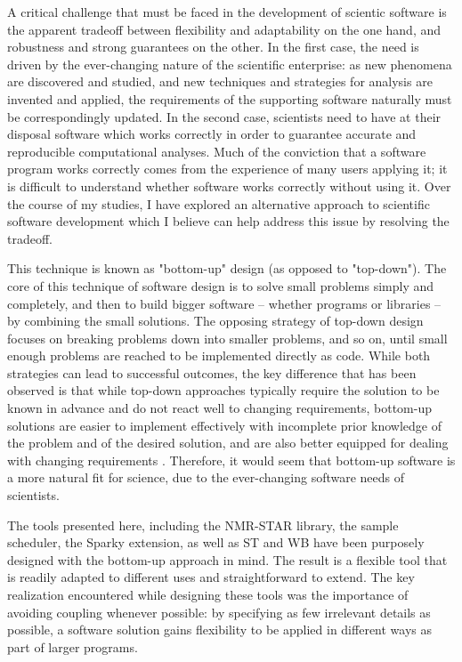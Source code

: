 A critical challenge that must be faced in the development of scientic software
is the apparent tradeoff between flexibility and adaptability on the one hand,
and robustness and strong guarantees on the other.  In the first case, the 
need is driven by the ever-changing nature of the scientific enterprise: as
new phenomena are discovered and studied, and new techniques and strategies for
analysis are invented and applied, the requirements of the supporting software
naturally must be correspondingly updated.  In the second case, scientists 
need to have at their disposal software which works correctly in order to 
guarantee accurate and reproducible computational analyses.  Much of the 
conviction that a software program works correctly comes from the experience 
of many users applying it; it is difficult to understand whether software 
works correctly without using it.  Over the course of my studies, I have 
explored an alternative approach to scientific software development which I 
believe can help address this issue by resolving the tradeoff.

This technique is known as "bottom-up" \cite{bottomup1994, bottomup2004} design
(as opposed to "top-down").  The core of this technique of software design is
to solve small problems simply and completely, and then to build bigger software
 -- whether programs or libraries -- by combining the small solutions.  The
opposing strategy of top-down design focuses on breaking problems down into 
smaller problems, and so on, until small enough problems are reached to be 
implemented directly as code.  While both strategies can lead to successful
outcomes, the key difference that has been observed is that while top-down
approaches typically require the solution to be known in advance and do not
react well to changing requirements, bottom-up solutions are easier to implement
effectively with incomplete prior knowledge of the problem and of the desired
solution, and are also better equipped for dealing with changing requirements 
\cite{topdown_bottomup, bottomup1994, bottomup2004}.  Therefore, it would seem
that bottom-up software is a more natural fit for science, due to the 
ever-changing software needs of scientists.

The tools presented here, including the NMR-STAR library, the sample scheduler, 
the Sparky extension, as well as ST and WB have been purposely designed with 
the bottom-up approach in mind.  The result is a flexible tool
that is readily adapted to different uses and straightforward to extend.
The key realization encountered while designing these tools
was the importance of avoiding coupling \cite{coupling1992} whenever possible:
by specifying as few irrelevant details as possible, a software solution gains
flexibility to be applied in different ways as part of larger programs.
 


